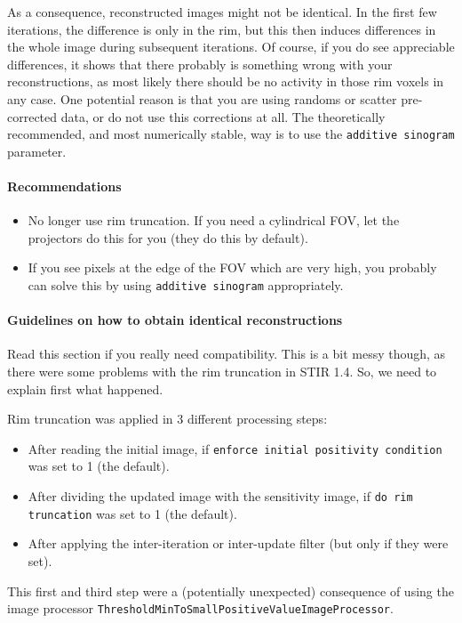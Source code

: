 \documentclass{article}
\begin{document}
As a consequence, reconstructed images might not be identical. In the first
few iterations, the difference is only in the rim, but this then
induces differences in the whole image during subsequent iterations. Of course,
if you do see appreciable differences, it shows that there probably is something
wrong with your reconstructions, as most likely there should be no activity
in those rim voxels in any case. One potential reason is that you are
using randoms or scatter pre-corrected data, or do not use this corrections 
at all. The theoretically recommended, and most numerically stable,
 way is to use the \texttt{additive sinogram} parameter.\\


\paragraph{Recommendations}
\begin{itemize}
\item No longer use rim truncation. If you need a cylindrical FOV, let the
projectors do this for you (they do this by default).
\item If you see pixels at the edge of the FOV which are very high, you
probably can solve this by using  \texttt{additive sinogram} appropriately.
\end{itemize}

\paragraph{Guidelines on how to obtain identical reconstructions\\}
Read this section if you really need compatibility. This is a bit 
messy though, as there were some problems
with the rim truncation in STIR 1.4. So, we need to explain first
what happened.

Rim truncation was applied in 3 different processing steps:
\begin{itemize}
\item After reading the initial image, if
\texttt{enforce initial positivity condition} was set to 1 (the default).
\item After dividing the updated image with the sensitivity image, if
\texttt{do rim truncation} was set to 1 (the default).
\item After applying the inter-iteration or inter-update filter (but
only if they were set).
\end{itemize}
This first and third step were a (potentially unexpected) consequence of using
the image processor \texttt{ThresholdMinToSmallPositiveValueImageProcessor}. 
\end{document}
